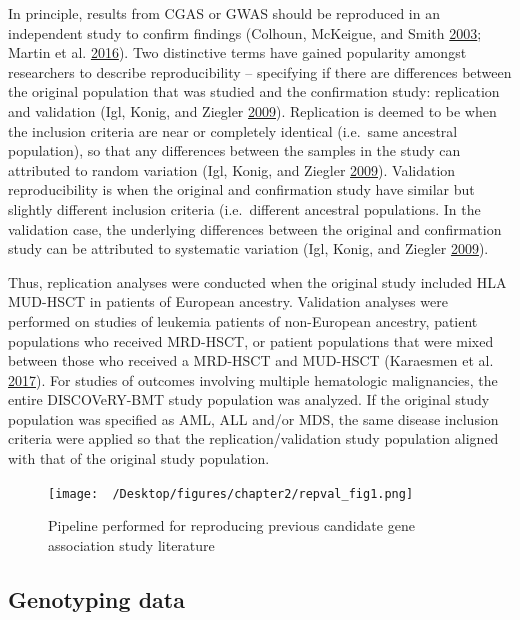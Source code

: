 \documentclass[]{DissertateOSU}
\begin{document}
In principle, results from CGAS or GWAS should be reproduced in an
independent study to confirm findings (Colhoun, McKeigue, and Smith
\protect\hyperlink{ref-colhoun2003}{2003}; Martin et al.
\protect\hyperlink{ref-martin_2016}{2016}). Two distinctive terms have
gained popularity amongst researchers to describe reproducibility --
specifying if there are differences between the original population that
was studied and the confirmation study: replication and validation (Igl,
Konig, and Ziegler \protect\hyperlink{ref-Igl_2009}{2009}). Replication
is deemed to be when the inclusion criteria are near or completely
identical (i.e.~same ancestral population), so that any differences
between the samples in the study can attributed to random variation
(Igl, Konig, and Ziegler \protect\hyperlink{ref-Igl_2009}{2009}).
Validation reproducibility is when the original and confirmation study
have similar but slightly different inclusion criteria (i.e.~different
ancestral populations. In the validation case, the underlying
differences between the original and confirmation study can be
attributed to systematic variation (Igl, Konig, and Ziegler
\protect\hyperlink{ref-Igl_2009}{2009}).

Thus, replication analyses were conducted when the original study
included HLA MUD-HSCT in patients of European ancestry. Validation
analyses were performed on studies of leukemia patients of non-European
ancestry, patient populations who received MRD-HSCT, or patient
populations that were mixed between those who received a MRD-HSCT and
MUD-HSCT (Karaesmen et al.
\protect\hyperlink{ref-Karaesmen_2017}{2017}). For studies of outcomes
involving multiple hematologic malignancies, the entire DISCOVeRY-BMT
study population was analyzed. If the original study population was
specified as AML, ALL and/or MDS, the same disease inclusion criteria
were applied so that the replication/validation study population aligned
with that of the original study population.

\begin{figure}
\centering
\texttt{[image: ~/Desktop/figures/chapter2/repval\_fig1.png]}
\caption{Pipeline performed for reproducing previous candidate gene
association study literature}
\end{figure}

\subsection{Genotyping data}\label{genotyping-data}
\end{document}
